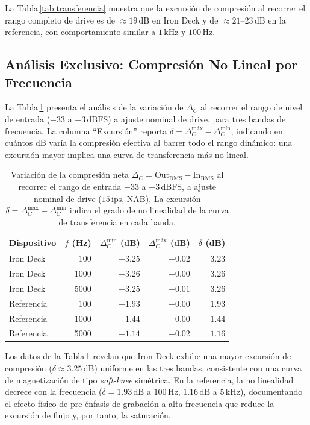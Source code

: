 \documentclass[10pt,conference]{IEEEtran}
\begin{document}
La Tabla\,\ref{tab:transferencia} muestra que la excursión de compresión al recorrer el
rango completo de drive es de $\approx 19\,\text{dB}$ en Iron Deck y de
$\approx 21$--$23\,\text{dB}$ en la referencia, con comportamiento similar a $1\,\text{kHz}$
y $100\,\text{Hz}$.

\subsection{Análisis Exclusivo: Compresión No Lineal por Frecuencia}
\label{sec:compresion_frec}

La Tabla\,\ref{tab:compresion} presenta el análisis de la variación de $\Delta_C$ al
recorrer el rango de nivel de entrada ($-33$ a $-3\,\text{dBFS}$) a ajuste nominal de
drive, para tres bandas de frecuencia. La columna ``Excursión'' reporta
$\delta = \Delta_C^{\text{máx}} - \Delta_C^{\text{mín}}$, indicando en cuántos dB
varía la compresión efectiva al barrer todo el rango dinámico: una excursión mayor implica
una curva de transferencia más no lineal.

\begin{table}[htbp]
\caption{Variación de la compresión neta $\Delta_C = \text{Out}_\text{RMS} -
\text{In}_\text{RMS}$ al recorrer el rango de entrada $-33$ a $-3\,\text{dBFS}$,
a ajuste nominal de drive ($15\,\text{ips}$, NAB). La excursión
$\delta = \Delta_C^{\text{máx}} - \Delta_C^{\text{mín}}$ indica el grado
de no linealidad de la curva de transferencia en cada banda.}
\label{tab:compresion}
\centering
\small
\begin{tabular}{lrrrr}
\toprule
Dispositivo & $f$ (Hz) & $\Delta_C^{\text{mín}}$ (dB) & $\Delta_C^{\text{máx}}$ (dB) & $\delta$ (dB) \\
\midrule
Iron Deck  & 100  & $-3.25$ & $-0.02$ & $3.23$ \\
Iron Deck  & 1000 & $-3.26$ & $-0.00$ & $3.26$ \\
Iron Deck  & 5000 & $-3.25$ & $+0.01$ & $3.26$ \\
\midrule
Referencia & 100  & $-1.93$ & $-0.00$ & $1.93$ \\
Referencia & 1000 & $-1.44$ & $-0.00$ & $1.44$ \\
Referencia & 5000 & $-1.14$ & $+0.02$ & $1.16$ \\
\bottomrule
\end{tabular}
\end{table}

Los datos de la Tabla\,\ref{tab:compresion} revelan que Iron Deck exhibe una mayor excursión
de compresión ($\delta \approx 3.25\,\text{dB}$) uniforme en las tres bandas, consistente
con una curva de magnetización de tipo \emph{soft-knee} simétrica. En la referencia, la
no linealidad decrece con la frecuencia ($\delta = 1.93\,\text{dB}$ a $100\,\text{Hz}$,
$1.16\,\text{dB}$ a $5\,\text{kHz}$), documentando el efecto físico de pre-énfasis
de grabación a alta frecuencia que reduce la excursión de flujo y, por tanto, la saturación.
\end{document}
